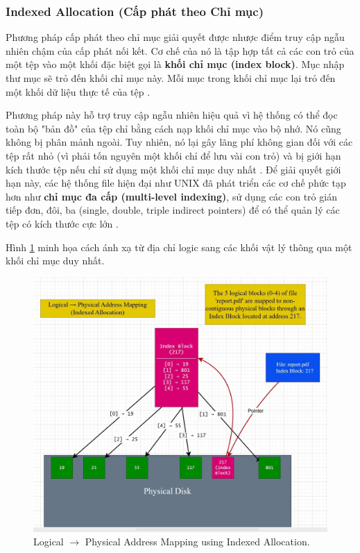 \documentclass[12pt]{article}
\begin{document}
\subsubsection{Indexed Allocation (Cấp phát theo Chỉ mục)}
Phương pháp cấp phát theo chỉ mục giải quyết được nhược điểm truy cập ngẫu nhiên chậm của cấp phát nối kết. Cơ chế của nó là tập hợp tất cả các con trỏ của một tệp vào một khối đặc biệt gọi là \textbf{khối chỉ mục (index block)}. Mục nhập thư mục sẽ trỏ đến khối chỉ mục này. Mỗi mục trong khối chỉ mục lại trỏ đến một khối dữ liệu thực tế của tệp \parencite{Silberschatz2018}.

Phương pháp này hỗ trợ truy cập ngẫu nhiên hiệu quả vì hệ thống có thể đọc toàn bộ "bản đồ" của tệp chỉ bằng cách nạp khối chỉ mục vào bộ nhớ. Nó cũng không bị phân mảnh ngoài. Tuy nhiên, nó lại gây lãng phí không gian đối với các tệp rất nhỏ (vì phải tốn nguyên một khối chỉ để lưu vài con trỏ) và bị giới hạn kích thước tệp nếu chỉ sử dụng một khối chỉ mục duy nhất \parencite{IRJMETS2021}. Để giải quyết giới hạn này, các hệ thống file hiện đại như UNIX đã phát triển các cơ chế phức tạp hơn như \textbf{chỉ mục đa cấp (multi-level indexing)}, sử dụng các con trỏ gián tiếp đơn, đôi, ba (single, double, triple indirect pointers) để có thể quản lý các tệp có kích thước cực lớn \parencite{Tanenbaum2014}.

Hình \ref{fig:indexed_allocation_diagram} minh họa cách ánh xạ từ địa chỉ logic sang các khối vật lý thông qua một khối chỉ mục duy nhất.

\begin{figure}[H]
    \centering
    \includegraphics[width=\textwidth]{image/diagram mapping Indexed Allocation.jpg}
    \caption{Logical $\rightarrow$ Physical Address Mapping using Indexed Allocation.}
    \label{fig:indexed_allocation_diagram}
\end{figure}
\end{document}
